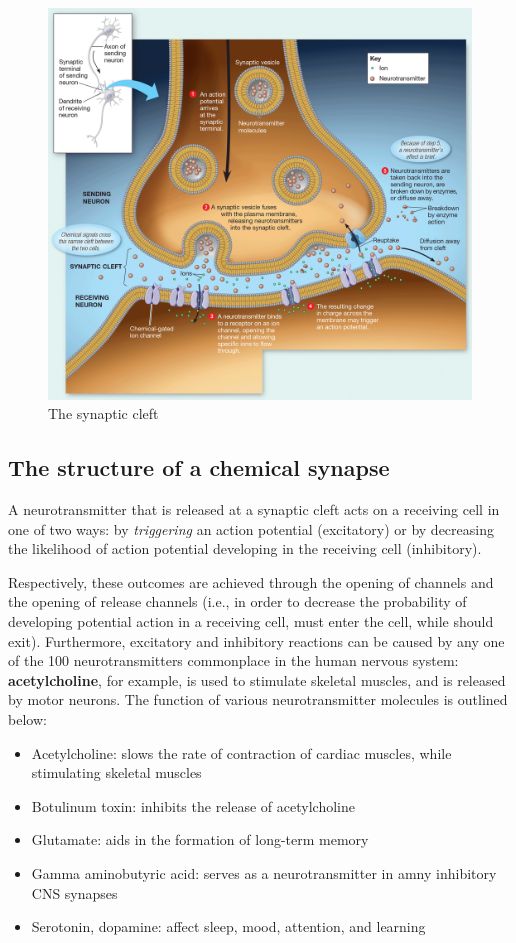 \documentclass{article}
\begin{document}
\begin{figure}[h]
	\centering
	\includegraphics[width=0.75\linewidth]{synaptic_cleft.png}
	\caption{The synaptic cleft}
\end{figure}


\subsection{The structure of a chemical synapse}

A neurotransmitter that is released at a synaptic cleft acts on a receiving cell
in one of two ways: by \emph{triggering} an action potential (excitatory) or
by decreasing the likelihood of action potential developing in the receiving
cell (inhibitory).

Respectively, these outcomes are achieved through the opening of  channels
and the opening of  release channels (i.e., in order to decrease the
probability of developing potential action in a receiving cell,  must
enter the cell, while  should exit). Furthermore, excitatory and
inhibitory reactions can be caused by any one of the 100 neurotransmitters
commonplace in the human nervous system: \textbf{acetylcholine}, for example, is
used to stimulate skeletal muscles, and is released by motor neurons.
The function of various neurotransmitter molecules is outlined below:

\begin{itemize}
	\item Acetylcholine: slows the rate of contraction of cardiac muscles, while
		stimulating skeletal muscles
	\item Botulinum toxin: inhibits the release of acetylcholine
	\item Glutamate: aids in the formation of long-term memory
	\item Gamma aminobutyric acid: serves as a neurotransmitter in amny inhibitory
		CNS synapses
	\item Serotonin, dopamine: affect sleep, mood, attention, and learning
\end{itemize}
\end{document}
